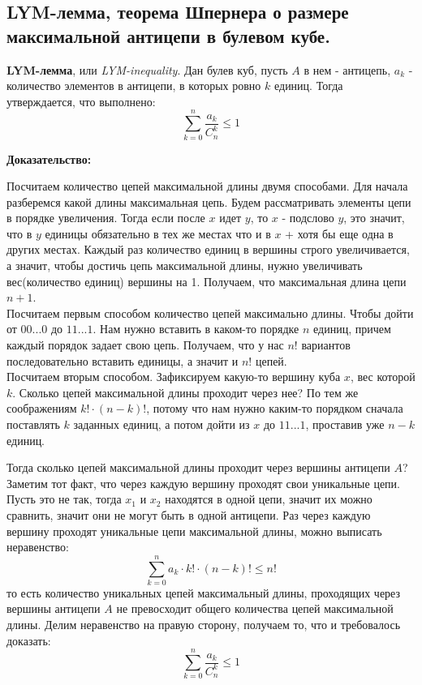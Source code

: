 \subsection{LYM-лемма, теорема Шпернера о размере максимальной антицепи в булевом кубе.}

\textbf{LYM-лемма}, или \textit{LYM-inequality}. Дан булев куб, пусть $A$ в нем - антицепь, $a_k$ - количество элементов в антицепи, в которых ровно $k$ единиц. Тогда утверждается, что выполнено:
\[
\sum_{k = 0}^{n} \frac{a_k}{C_{n}^{k}} \leq 1 
\]

\noindent \textbf{Доказательство:}

Посчитаем количество цепей максимальной длины двумя способами. Для начала разберемся какой длины максимальная цепь. Будем рассматривать элементы цепи в порядке увеличения. Тогда если после $x$ идет $y$, то $x$ - подслово $y$, это значит, что в $y$ единицы обязательно в тех же местах что и в $x$ + хотя бы еще одна в других местах. Каждый раз количество единиц в вершины строго увеличивается, а значит, чтобы достичь цепь максимальной длины, нужно увеличивать вес(количество единиц) вершины на 1. Получаем, что максимальная длина цепи $n + 1$. \\

Посчитаем первым способом количество цепей максимально длины. Чтобы дойти от $00...0$ до $11...1$. Нам нужно вставить в каком-то порядке $n$ единиц, причем каждый порядок задает свою цепь. Получаем, что у нас $n!$ вариантов последовательно вставить единицы, а значит и $n!$ цепей. \\

Посчитаем вторым способом. Зафиксируем какую-то вершину куба $x$, вес которой $k$. Сколько цепей максимальной длины проходит через нее? По тем же соображениям $k! \cdot (n - k)!$, потому что нам нужно каким-то порядком сначала поставлять $k$ заданных единиц, а потом дойти из $x$ до $11...1$, проставив уже $n - k$ единиц. 

Тогда сколько цепей максимальной длины проходит через вершины антицепи $A$? Заметим тот факт, что через каждую вершину проходят свои уникальные цепи. Пусть это не так, тогда $x_1$ и $x_2$ находятся в одной цепи, значит их можно сравнить, значит они не могут быть в одной антицепи. Раз через каждую вершину проходят уникальные цепи максимальной длины, можно выписать неравенство:
\[
\sum_{k = 0}^{n} a_k \cdot k! \cdot (n - k)! \leq n!
\]
то есть количество уникальных цепей максимальный длины, проходящих через вершины антицепи $A$ не превосходит общего количества цепей максимальной длины. Делим неравенство на правую сторону, получаем то, что и требовалось доказать:
\[
\sum_{k = 0}^{n} \frac{a_k}{C_{n}^{k}} \leq 1
\]
	\\ \\ \\

